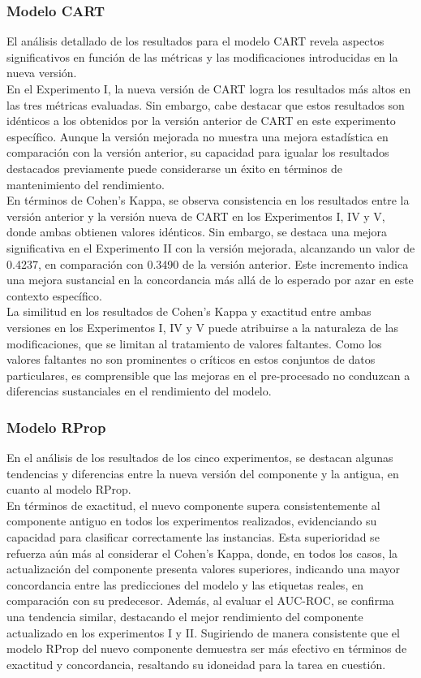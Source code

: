 \subsubsection*{Modelo CART}
El análisis detallado de los resultados para el modelo CART revela aspectos significativos en función de las métricas y las modificaciones introducidas en la nueva  versión. \\
En el Experimento I, la nueva versión de CART logra los resultados más altos en las tres métricas evaluadas. Sin embargo, cabe destacar que estos resultados son idénticos a los obtenidos por la versión anterior de CART en este experimento específico. Aunque la versión mejorada no muestra una mejora estadística en comparación con la versión anterior, su capacidad para igualar los resultados destacados previamente puede considerarse un éxito en términos de mantenimiento del rendimiento. \\
En términos de Cohen's Kappa, se observa consistencia en los resultados entre la versión anterior y la versión nueva de CART en los Experimentos I, IV y V, donde ambas  obtienen valores idénticos. Sin embargo, se destaca una mejora significativa en el Experimento II con la versión mejorada, alcanzando un valor de 0.4237, en comparación con 0.3490 de la versión anterior. Este incremento indica una mejora sustancial en la concordancia más allá de lo esperado por azar en este contexto específico.  \\
La similitud en los resultados de Cohen's Kappa y exactitud entre ambas versiones en los Experimentos I, IV y V puede atribuirse a la naturaleza de las modificaciones, que se limitan al tratamiento de valores faltantes. Como los valores faltantes no son prominentes o críticos en estos conjuntos de datos particulares, es comprensible que las mejoras en el pre-procesado no conduzcan a diferencias sustanciales en el rendimiento del modelo.

\subsubsection*{Modelo RProp}
En el análisis de los resultados de los cinco experimentos, se destacan algunas tendencias y diferencias entre la nueva versión del componente y la antigua, en cuanto al modelo RProp. \\
En términos de exactitud, el nuevo componente supera consistentemente al componente antiguo en todos los experimentos realizados, evidenciando su capacidad para clasificar correctamente las instancias. Esta superioridad se refuerza aún más al considerar el Cohen's Kappa, donde, en todos los casos, la actualización del componente presenta valores superiores, indicando una mayor concordancia entre las predicciones del modelo y las etiquetas reales, en comparación con su predecesor. Además, al evaluar el AUC-ROC, se confirma una tendencia similar, destacando el mejor rendimiento del componente actualizado en los experimentos I y II. Sugiriendo de manera consistente que el modelo RProp del nuevo componente demuestra ser más efectivo en términos de exactitud y concordancia, resaltando su idoneidad para la tarea en cuestión.

